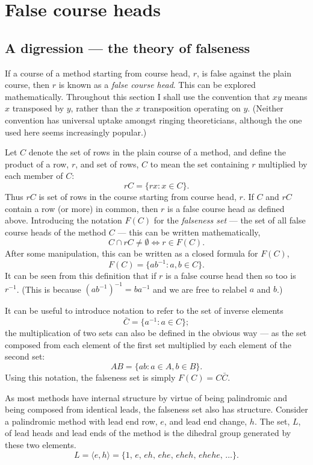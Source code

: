 \documentclass[a4paper,11pt,oneside]{book}
\def\textitidx#1{\textit{#1}\index{#1}}
\begin{document}
\section{False course heads}\label{fch}
\subsection{A digression — the theory of falseness}%
\label{falsetheo}

If a course of a method starting from course head, $r$, is false against the 
plain course, then $r$ is known as a \textitidx{false course head}.  This 
can be explored mathematically.  Throughout this section I shall use the
convention that $xy$ means $x$ transposed by $y$, rather than the $x$ 
transposition operating on $y$.  (Neither convention has universal uptake
amongst ringing theoreticians, although the one used here seems increasingly
popular.)

Let $C$ denote the set of rows in the plain course of a method, 
and define the product of a row, $r$, and set of rows, $C$ to mean 
the set containing $r$ multiplied by each member of $C$:
\[ rC = \{ r x : x \in C \}. \]
Thus $rC$ is set of rows in the course starting from course head, $r$.
If $C$ and $rC$ contain a row (or more) in common, then $r$ is a false 
course head as defined above.  Introducing the notation $F(C)$ for the 
\textitidx{falseness set} 
--- the set of all false course heads of the method $C$ --- 
this can be written mathematically,
\[ C \cap rC \ne \emptyset \iff r \in F(C). \]
After some manipulation, this can be written as a closed formula for $F(C)$,
\[ F(C) = \{ a b^{-1} : a, b \in C \}. \]
It can be seen from this definition that if $r$ is a false course head then
so too is $r^{-1}$.  (This is because $(a b^{-1})^{-1} = b a^{-1}$ and we
are free to relabel $a$ and $b$.)

It can be useful to introduce notation to refer to the set of inverse elements
\[ \bar{C} = \{ a^{-1} : a \in C \}; \]
the multiplication of two sets can also be defined in the obvious way 
--- as the set composed from each element of the first set multiplied by each 
element of the second set: 
\[ AB = \{ a b : a \in A, b \in B \}. \]
Using this notation, the falseness set is simply $F(C) = C\bar{C}$.

As most methods have internal structure by virtue of being palindromic%
 and being composed from identical leads, 
the falseness set also has structure.  
Consider a palindromic method with lead end row, $e$, and lead end change, $h$.
The set, $L$, of lead heads and lead ends of the method is the 
dihedral group generated by these two elements.
\[ L = \langle e, h \rangle 
     = \{ 1,\, e,\, eh,\, ehe,\, eheh,\, ehehe,\, \ldots \}. \]
\end{document}

